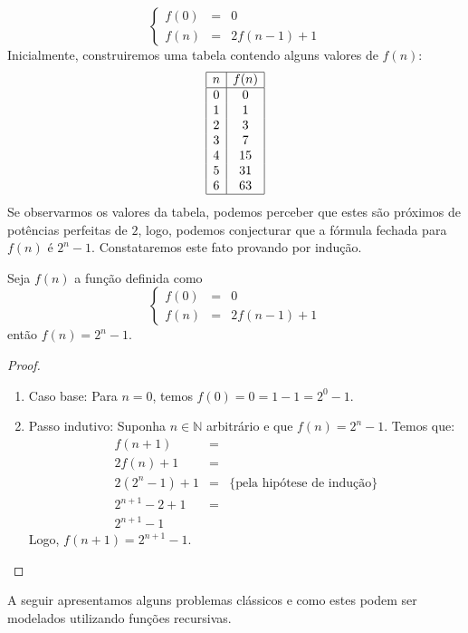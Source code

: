 \[
\left\{
\begin{array}{lcl}
    f(0) & = & 0\\
    f(n) & = & 2f(n - 1) + 1
\end{array}
\right.
\]
Inicialmente, construiremos uma tabela contendo alguns valores de
$f(n)$:
\[
\begin{array}{|c|c|}
  \hline
  n & f(n) \\ \hline
  0 &  0 \\
  1 &  1 \\
  2 &  3 \\
  3 &  7 \\
  4 & 15 \\
  5 & 31\\
  6 & 63 \\ \hline
\end{array}
\]
Se observarmos os valores da tabela, podemos perceber que estes são
próximos de potências perfeitas de $2$, logo, podemos conjecturar que
a fórmula fechada para $f(n)$ é $2^n - 1$. Constataremos este fato
provando por indução.
\begin{Theorem}\label{thmhanoi}
Seja $f(n)$ a função definida como
\[
\left\{
\begin{array}{lcl}
    f(0) & = & 0\\
    f(n) & = & 2f(n - 1) + 1
\end{array}
\right.
\]
então $f(n) = 2^n - 1$.
\end{Theorem}
\begin{proof}
\verb| |\\
\begin{enumerate}
  \item[\ ]Caso base: Para $n = 0$, temos $f(0) = 0 = 1 - 1 = 2^0 - 1$.
  \item[\ ]Passo indutivo: Suponha $n\in\mathbb{N}$ arbitrário e que
    $f(n) = 2^n - 1$. Temos que:
\[
\begin{array}{lcl}
    f(n + 1) & = & \\
    2f(n) + 1 & = & \\
    2(2^n - 1) + 1 & = & \{\text{pela hipótese de indução}\}\\
    2^{n+1} - 2 + 1 & = &\\
    2^{n+1} - 1
\end{array}
\]
Logo, $f(n + 1) = 2^{n + 1} - 1$.
\end{enumerate}
\end{proof}
A seguir apresentamos alguns problemas clássicos e como estes podem
ser modelados utilizando funções recursivas.


